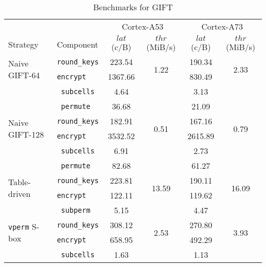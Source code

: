 \begin{table}[h!]
    \centering
    \caption{Benchmarks for GIFT}
    \footnotesize
    \begin{tabular}{llcccc}
        \toprule
        & & \multicolumn{2}{c}{Cortex-A53} & \multicolumn{2}{c}{Cortex-A73} \\
        \cmidrule(lr){3-4}\cmidrule(lr){5-6}
        Strategy & Component & $lat$ (c/B) & $thr$ (MiB/s) & $lat$ (c/B) & $thr$ (MiB/s) \\
        \midrule
        \multirow{2}{*}{Naive GIFT-64} & \texttt{round\_keys} & 223.54 & \multirow{2}{*}{1.22} & 190.34 & \multirow{2}{*}{2.33} \\
                                                & \texttt{encrypt} & 1367.66 & &  830.49 & \\
        \cmidrule(lr){2-2}
                                                & \texttt{ subcells} & 4.64 & & 3.13 & \\
                                                & \texttt{  permute} & 36.68 & & 21.09 & \\
        \midrule
        \multirow{2}{*}{Naive GIFT-128} & \texttt{round\_keys} & 182.91 & \multirow{2}{*}{0.51} & 167.16 & \multirow{2}{*}{0.79} \\
                                                 & \texttt{encrypt} & 3532.52 & & 2615.89 & \\
        \cmidrule(lr){2-2}
                                                 & \texttt{ subcells} & 6.91 & & 2.73 & \\
                                                 & \texttt{ permute} & 82.68 & & 61.27 & \\
        \midrule
        \multirow{2}{*}{Table-driven} & \texttt{round\_keys} & 223.81 & \multirow{2}{*}{13.59} & 190.11 & \multirow{2}{*}{16.09} \\
                                      & \texttt{encrypt} & 122.11 & & 119.62 & \\
        \cmidrule(lr){2-2}
                                      & \texttt{ subperm} & 5.15 & & 4.47 & \\
        \midrule
        \multirow{2}{*}{\texttt{vperm} S-box} & \texttt{round\_keys} & 308.12 & \multirow{2}{*}{2.53} & 270.80 & \multirow{2}{*}{3.93} \\
                                              & \texttt{encrypt} & 658.95 & & 492.29 & \\
        \cmidrule(lr){2-2}
                                              & \texttt{ subcells} & 1.63 & & 1.13 & \\

\end{tabular}
\end{table}
